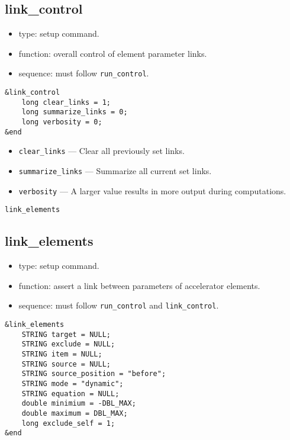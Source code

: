 \documentclass[11pt]{article}
\begin{document}
\subsection{link\_control \label{subsec:linkcontrol}}

\begin{itemize}
\item type: setup command.
\item function: overall control of element parameter links.
\item sequence: must follow \verb|run_control|.
\end{itemize}

\begin{verbatim}
&link_control
    long clear_links = 1;
    long summarize_links = 0;
    long verbosity = 0;
&end
\end{verbatim}

\begin{itemize}
\item \verb|clear_links| --- Clear all previously set links.
\item \verb|summarize_links| --- Summarize all current set links.
\item \verb|verbosity| --- A larger value results in more output
during computations.

\end{itemize}

\newpage
\begin{center}{\Large\verb|link_elements|}\end{center}
\subsection{link\_elements \label{subsec:linkelements}}

\begin{itemize}
\item type: setup command.
\item function: assert a link between parameters of accelerator elements.
\item sequence: must follow \verb|run_control| and \verb|link_control|.
\end{itemize}

\begin{verbatim}
&link_elements
    STRING target = NULL;
    STRING exclude = NULL;
    STRING item = NULL;
    STRING source = NULL;
    STRING source_position = "before";
    STRING mode = "dynamic";
    STRING equation = NULL;
    double minimium = -DBL_MAX;
    double maximum = DBL_MAX;
    long exclude_self = 1;
&end
\end{verbatim}
\end{document}
